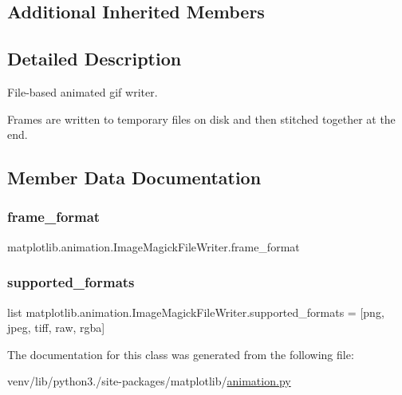 \subsection*{Additional Inherited Members}


\subsection{Detailed Description}
\begin{DoxyVerb}File-based animated gif writer.

Frames are written to temporary files on disk and then stitched
together at the end.
\end{DoxyVerb}
 

\subsection{Member Data Documentation}
\mbox{\label{classmatplotlib_1_1animation_1_1ImageMagickFileWriter_a3a9df10550b14fb335ca2fdfe79c2781}} 
\subsubsection{\texorpdfstring{frame\+\_\+format}{frame\_format}}
{\footnotesize\ttfamily matplotlib.\+animation.\+Image\+Magick\+File\+Writer.\+frame\+\_\+format}

\mbox{\label{classmatplotlib_1_1animation_1_1ImageMagickFileWriter_ae902db3e2d79b0dee683df573b2b9cb3}} 
\subsubsection{\texorpdfstring{supported\+\_\+formats}{supported\_formats}}
{\footnotesize\ttfamily list matplotlib.\+animation.\+Image\+Magick\+File\+Writer.\+supported\+\_\+formats = \mbox{[}\textquotesingle{}png\textquotesingle{}, \textquotesingle{}jpeg\textquotesingle{}, \textquotesingle{}tiff\textquotesingle{}, \textquotesingle{}raw\textquotesingle{}, \textquotesingle{}rgba\textquotesingle{}\mbox{]}\hspace{0.3cm}{\ttfamily [static]}}



The documentation for this class was generated from the following file\+:\begin{DoxyCompactItemize}
\item 
venv/lib/python3./site-\/packages/matplotlib/\hyperlink{animation_8py}{animation.\+py}\end{DoxyCompactItemize}
